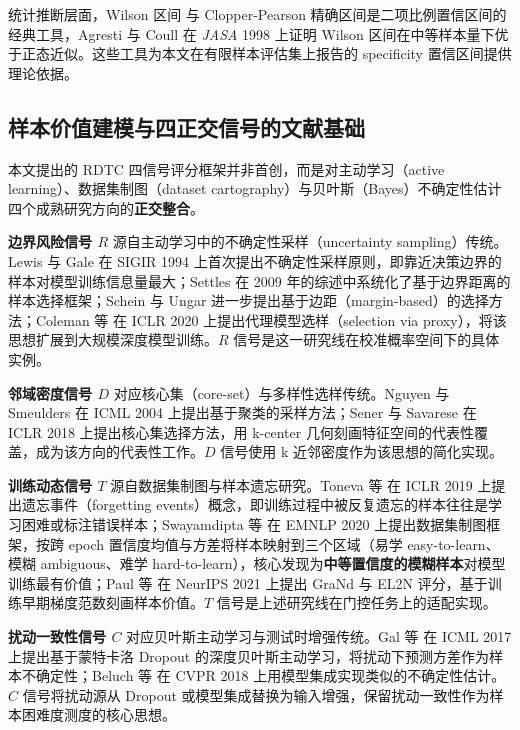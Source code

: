 \documentclass[UTF8,openany,12pt]{ctexbook}
\begin{document}
统计推断层面，Wilson 区间\cite{wilson1927probable} 与 Clopper-Pearson 精确区间\cite{clopper1934use}是二项比例置信区间的经典工具，Agresti 与 Coull 在 \emph{JASA} 1998 上证明 Wilson 区间在中等样本量下优于正态近似\cite{agresti1998approximate}。这些工具为本文在有限样本评估集上报告的 specificity 置信区间提供理论依据。

\subsection{样本价值建模与四正交信号的文献基础}
本文提出的 RDTC 四信号评分框架并非首创，而是对主动学习（active learning）、数据集制图（dataset cartography）与贝叶斯（Bayes）不确定性估计四个成熟研究方向的\textbf{正交整合}。

\textbf{边界风险信号 $R$} 源自主动学习中的不确定性采样（uncertainty sampling）传统。Lewis 与 Gale\cite{lewis1994sequential} 在 SIGIR 1994 上首次提出不确定性采样原则，即靠近决策边界的样本对模型训练信息量最大；Settles\cite{settles2009active} 在 2009 年的综述中系统化了基于边界距离的样本选择框架；Schein 与 Ungar\cite{schein2007active} 进一步提出基于边距（margin-based）的选择方法；Coleman 等\cite{coleman2020selection} 在 ICLR 2020 上提出代理模型选样（selection via proxy），将该思想扩展到大规模深度模型训练。$R$ 信号是这一研究线在校准概率空间下的具体实例。

\textbf{邻域密度信号 $D$} 对应核心集（core-set）与多样性选样传统。Nguyen 与 Smeulders\cite{nguyen2004active} 在 ICML 2004 上提出基于聚类的采样方法；Sener 与 Savarese\cite{sener2018active} 在 ICLR 2018 上提出核心集选择方法，用 k-center 几何刻画特征空间的代表性覆盖，成为该方向的代表性工作。$D$ 信号使用 k 近邻密度作为该思想的简化实现。

\textbf{训练动态信号 $T$} 源自数据集制图与样本遗忘研究。Toneva 等\cite{toneva2019empirical} 在 ICLR 2019 上提出遗忘事件（forgetting events）概念，即训练过程中被反复遗忘的样本往往是学习困难或标注错误样本；Swayamdipta 等\cite{swayamdipta2020cartography} 在 EMNLP 2020 上提出数据集制图框架，按跨 epoch 置信度均值与方差将样本映射到三个区域（易学 easy-to-learn、模糊 ambiguous、难学 hard-to-learn），核心发现为\textbf{中等置信度的模糊样本}对模型训练最有价值；Paul 等\cite{paul2021deep} 在 NeurIPS 2021 上提出 GraNd 与 EL2N 评分，基于训练早期梯度范数刻画样本价值。$T$ 信号是上述研究线在门控任务上的适配实现。

\textbf{扰动一致性信号 $C$} 对应贝叶斯主动学习与测试时增强传统。Gal 等\cite{gal2017deep} 在 ICML 2017 上提出基于蒙特卡洛 Dropout 的深度贝叶斯主动学习，将扰动下预测方差作为样本不确定性；Beluch 等\cite{beluch2018power} 在 CVPR 2018 上用模型集成实现类似的不确定性估计。$C$ 信号将扰动源从 Dropout 或模型集成替换为输入增强，保留扰动一致性作为样本困难度测度的核心思想。
\end{document}
